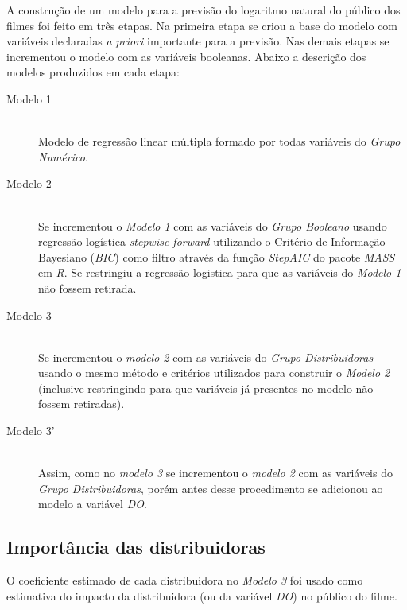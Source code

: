 \documentclass[11pt,a4paper]{article}
\begin{document}
A construção de um modelo para a previsão do logaritmo natural do público dos filmes foi feito em três etapas. Na primeira etapa se criou a base do modelo com variáveis declaradas \textit{a priori} importante para a previsão. Nas demais etapas se incrementou o modelo com as variáveis booleanas. Abaixo a descrição dos modelos produzidos em cada etapa:

\begin{description}

  \item[Modelo 1] \hfill \\
  Modelo de regressão linear múltipla formado por todas variáveis do \textit{Grupo Numérico}.

    \item[Modelo 2] \hfill \\
   Se incrementou o \textit{Modelo 1} com as variáveis do \textit{Grupo Booleano} usando regressão logística \textit{stepwise forward} utilizando o Critério de Informação Bayesiano (\textit{BIC}) como filtro através da função \textit{StepAIC} do pacote \textit{MASS} em \textit{R}. Se restringiu a regressão logistica para que as variáveis do \textit{Modelo 1} não fossem retirada. 

  \item[Modelo 3] \hfill \\
  Se incrementou o \textit{modelo 2} com as variáveis do \textit{Grupo Distribuidoras} usando o mesmo método e critérios utilizados para construir o \textit{Modelo 2} (inclusive restringindo  para que variáveis já presentes no modelo não fossem retiradas).
  
    \item[Modelo 3'] \hfill \\
    Assim, como no \textit{modelo 3} se incrementou o \textit{modelo 2} com as variáveis do \textit{Grupo Distribuidoras}, porém antes desse procedimento se adicionou ao modelo a variável \textit{DO}.
 
  
\end{description}


\subsection{Importância das distribuidoras}

O coeficiente estimado de cada distribuidora no \textit{Modelo 3} foi usado como estimativa do impacto da distribuidora (ou da variável \textit{DO}) no público do filme. 
\end{document}

